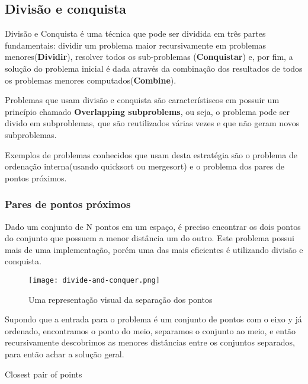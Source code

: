 \subsection{Divisão e conquista}

    Divisão e Conquista é uma técnica que pode ser dividida em três 
    partes fundamentais: dividir um problema maior recursivamente em 
    problemas menores(\textbf{Dividir}), resolver todos os 
    sub-problemas (\textbf{Conquistar}) e, por fim, a solução do problema inicial 
    é dada através da combinação dos resultados de todos os problemas 
    menores computados(\textbf{Combine}). 

    Problemas que usam divisão e conquista são característiscos em possuir um princípio 
    chamado \textbf{Overlapping subproblems}, ou seja, o problema pode ser divido em 
    subproblemas, que são reutilizados várias vezes e que não geram novos subproblemas.
    
    Exemplos de problemas conhecidos que usam desta estratégia são o problema de 
    ordenação interna(usando quicksort ou mergesort) e o problema dos pares de pontos próximos.

\subsubsection{Pares de pontos próximos}

    Dado um conjunto de N pontos em um espaço, é preciso encontrar os dois pontos do conjunto que possuem a 
    menor distância um do outro. Este problema possui mais de uma implementação, porém 
    uma das mais eficientes é utilizando divisão e conquista.

    \begin{figure}[ht]
        \centering
        \texttt{[image: divide-and-conquer.png]}
        \caption{Uma representação visual da separação dos pontos}
        \label{fig:divide-and-conquer}
    \end{figure}

    Supondo que a entrada para o problema é um conjunto de pontos com o eixo y já ordenado,
    encontramos o ponto do meio, separamos o conjunto ao meio, e então recursivamente descobrimos
    as menores distâncias entre os conjuntos separados, para então achar a solução geral.

    \newpage 

    \begin{algorithm}
        \caption{Closest pair of points} 
        \begin{algorithmic}[1]
        \EndIf
        \EndProcedure
        \end{algorithmic}
      \end{algorithm}

